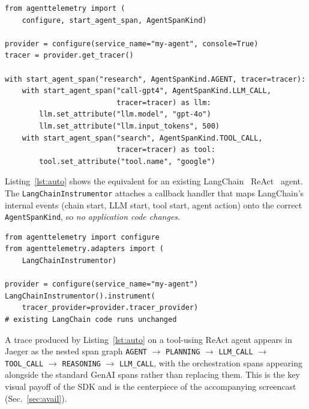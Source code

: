 \documentclass[10pt,conference]{IEEEtran}
\begin{document}
\begin{lstlisting}[caption={Manual instrumentation in 10 lines.},label={lst:manual}]
from agenttelemetry import (
    configure, start_agent_span, AgentSpanKind)

provider = configure(service_name="my-agent", console=True)
tracer = provider.get_tracer()

with start_agent_span("research", AgentSpanKind.AGENT, tracer=tracer):
    with start_agent_span("call-gpt4", AgentSpanKind.LLM_CALL,
                          tracer=tracer) as llm:
        llm.set_attribute("llm.model", "gpt-4o")
        llm.set_attribute("llm.input_tokens", 500)
    with start_agent_span("search", AgentSpanKind.TOOL_CALL,
                          tracer=tracer) as tool:
        tool.set_attribute("tool.name", "google")
\end{lstlisting}

Listing~\ref{lst:auto} shows the equivalent for an existing
LangChain~\cite{langchain} ReAct~\cite{react} agent. The
\texttt{LangChainInstrumentor} attaches a callback handler that
maps LangChain's internal events (chain start, LLM start, tool
start, agent action) onto the correct \texttt{AgentSpanKind}, so
\emph{no application code changes}.

\begin{lstlisting}[caption={Auto-instrumentation for an existing LangChain agent.},label={lst:auto}]
from agenttelemetry import configure
from agenttelemetry.adapters import (
    LangChainInstrumentor)

provider = configure(service_name="my-agent")
LangChainInstrumentor().instrument(
    tracer_provider=provider.tracer_provider)
# existing LangChain code runs unchanged
\end{lstlisting}

A trace produced by Listing~\ref{lst:auto} on a tool-using ReAct
agent appears in Jaeger as the nested span graph
\texttt{AGENT} $\to$ \texttt{PLANNING} $\to$ \texttt{LLM\_CALL}
$\to$ \texttt{TOOL\_CALL} $\to$ \texttt{REASONING} $\to$
\texttt{LLM\_CALL}, with the orchestration spans
appearing alongside the standard GenAI spans rather than replacing
them. This is the key visual payoff of the SDK and is the
centerpiece of the accompanying screencast (Sec.~\ref{sec:avail}).
\end{document}
